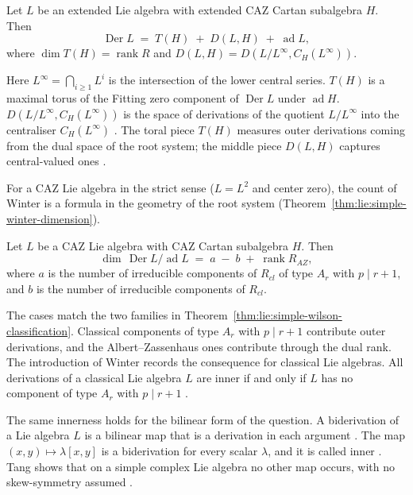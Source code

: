 \begin{theorem}\label{thm:lie:simple-winter-splitting}
Let $L$ be an extended Lie algebra with extended CAZ Cartan subalgebra
$H$.  Then
\[
\operatorname{Der} L\;=\;T(H)\;+\;D(L,H)\;+\;\operatorname{ad} L,
\]
where $\dim T(H)=\operatorname{rank} R$ and
$D(L,H)=D(L/L^{\infty},C_{H}(L^{\infty}))$.
\end{theorem}

Here $L^{\infty}=\bigcap_{i\geq 1}L^{i}$ is the intersection of the lower
central series.
$T(H)$ is a maximal torus of the Fitting zero component of
$\operatorname{Der} L$ under $\operatorname{ad} H$.
$D(L/L^{\infty},C_{H}(L^{\infty}))$ is the space of derivations of the
quotient $L/L^{\infty}$ into the centraliser $C_{H}(L^{\infty})$
\cite[p.~961]{Winter1984}.
The toral piece $T(H)$ measures outer
derivations coming from the dual space of the root system; the middle piece
$D(L,H)$ captures central-valued ones
\cite[Theorem~3.4, p.~970]{Winter1984}.

For a CAZ Lie algebra in the strict sense ($L=L^{2}$ and center zero),
the count of Winter is a formula in the geometry of the root system (Theorem~\ref{thm:lie:simple-winter-dimension}).

\begin{theorem}\label{thm:lie:simple-winter-dimension}
Let $L$ be a CAZ Lie algebra with CAZ Cartan subalgebra $H$.  Then
\[
\dim\,\operatorname{Der} L/\operatorname{ad} L\;=\;a\;-\;b\;+\;\operatorname{rank} R_{AZ},
\]
where $a$ is the number of irreducible components of $R_{cl}$ of type
$A_{r}$ with $p\mid r+1$, and $b$ is the number of irreducible components
of $R_{cl}$.
\end{theorem}

The cases match the two families in Theorem~\ref{thm:lie:simple-wilson-classification}.
Classical components of type $A_r$ with $p \mid r+1$ contribute outer
derivations, and the Albert--Zassenhaus ones contribute through the dual rank.
The introduction of Winter records the consequence for classical Lie
algebras.
All derivations of a classical Lie algebra $L$ are inner if and
only if $L$ has no component of type $A_{r}$ with $p\mid r+1$
\cite[p.~961]{Winter1984}.

The same innerness holds for the bilinear form of the question. A biderivation
of a Lie algebra $L$ is a bilinear map that is a derivation in each argument
\cite[Definition~1.1, p.~2]{Tang2017Biderivations}. The map $(x,y)\mapsto
\lambda[x,y]$ is a biderivation for every scalar $\lambda$, and it is called
inner \cite[p.~2]{Tang2017Biderivations}. Tang shows that on a simple complex Lie
algebra no other map occurs, with no skew-symmetry assumed
\cite[Theorem~2.4, p.~7]{Tang2017Biderivations}.


